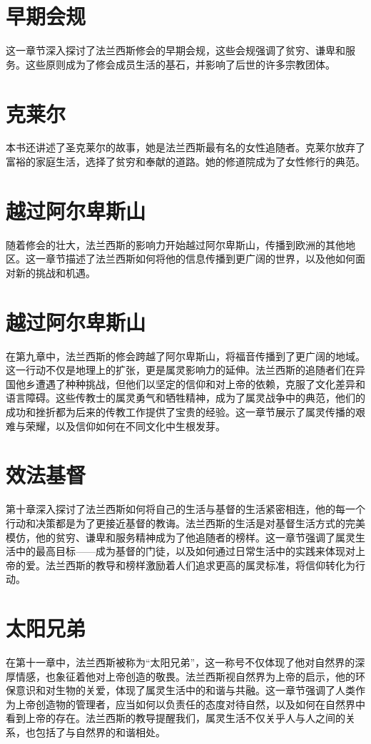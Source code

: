 \documentclass[12pt, a4paper]{ctexart}
\begin{document}
\section{早期会规}
这一章节深入探讨了法兰西斯修会的早期会规，这些会规强调了贫穷、谦卑和服务。这些原则成为了修会成员生活的基石，并影响了后世的许多宗教团体。
\section{克莱尔}
本书还讲述了圣克莱尔的故事，她是法兰西斯最有名的女性追随者。克莱尔放弃了富裕的家庭生活，选择了贫穷和奉献的道路。她的修道院成为了女性修行的典范。
\section{越过阿尔卑斯山}
随着修会的壮大，法兰西斯的影响力开始越过阿尔卑斯山，传播到欧洲的其他地区。这一章节描述了法兰西斯如何将他的信息传播到更广阔的世界，以及他如何面对新的挑战和机遇。
\section{越过阿尔卑斯山}
在第九章中，法兰西斯的修会跨越了阿尔卑斯山，将福音传播到了更广阔的地域。这一行动不仅是地理上的扩张，更是属灵影响力的延伸。法兰西斯的追随者们在异国他乡遭遇了种种挑战，但他们以坚定的信仰和对上帝的依赖，克服了文化差异和语言障碍。这些传教士的属灵勇气和牺牲精神，成为了属灵战争中的典范，他们的成功和挫折都为后来的传教工作提供了宝贵的经验。这一章节展示了属灵传播的艰难与荣耀，以及信仰如何在不同文化中生根发芽。
\section{效法基督}
第十章深入探讨了法兰西斯如何将自己的生活与基督的生活紧密相连，他的每一个行动和决策都是为了更接近基督的教诲。法兰西斯的生活是对基督生活方式的完美模仿，他的贫穷、谦卑和服务精神成为了他追随者的榜样。这一章节强调了属灵生活中的最高目标——成为基督的门徒，以及如何通过日常生活中的实践来体现对上帝的爱。法兰西斯的教导和榜样激励着人们追求更高的属灵标准，将信仰转化为行动。
\section{太阳兄弟}
在第十一章中，法兰西斯被称为“太阳兄弟”，这一称号不仅体现了他对自然界的深厚情感，也象征着他对上帝创造的敬畏。法兰西斯视自然界为上帝的启示，他的环保意识和对生物的关爱，体现了属灵生活中的和谐与共融。这一章节强调了人类作为上帝创造物的管理者，应当如何以负责任的态度对待自然，以及如何在自然界中看到上帝的存在。法兰西斯的教导提醒我们，属灵生活不仅关乎人与人之间的关系，也包括了与自然界的和谐相处。
\end{document}
